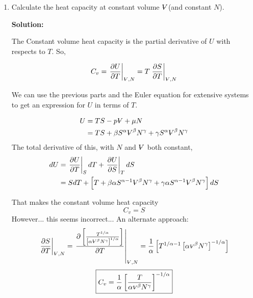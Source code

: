 \documentclass[10pt]{article}
\newenvironment{Solution}
    {\textbf{Solution:}
    
    \vspace{5mm}
    \begin{tcolorbox}
    }
    {
    \end{tcolorbox}
    \vspace{5mm}
    }
\newcommand{\vol}{{\ooalign{\hfil$V$\hfil\cr\kern0.08em--\hfil\cr}}}
\begin{document}
\begin{enumerate}
\begin{enumerate}
\begin{Solution}
    \end{Solution}


    \item Calculate the heat capacity at constant volume $\vol$(and constant $N$).
    
    \begin{Solution}    
    The Constant volume heat capacity is the partial derivative of $U$ with respects to $T$. So,
    
    \begin{equation}
        C_v = \left.\frac{\partial U}{\partial T}\right|_{\scriptsize{\vol},N} = T\left.\frac{\partial S}{\partial T}\right|_{\scriptsize{\vol},N}
    \end{equation}


    We can use the previous parts and the Euler equation for extensive systems to get an expression for $U$ in terms of $T$.
    
    \begin{align}
        U &= TS - p\vol + \mu N\\
        &= T S + \beta S^\alpha \vol^\beta N^\gamma + \gamma S^\alpha \vol^\beta N^\gamma
    \end{align}
    The total derivative of this, with $N$ and $\vol$ both constant,
    \begin{align}
        dU &= \left.\frac{\partial U}{\partial T}\right|_S dT + \left.\frac{\partial U}{\partial S}\right|_T dS\\
        &= S dT + \left[T + \beta\alpha S^{\alpha-1}\vol^\beta N^\gamma + \gamma\alpha S^{\alpha-1}\vol^\beta N^\gamma\right]dS
    \end{align}
    
    That makes the constant volume heat capacity
    \begin{equation}
    \boxed{
    C_v = S
    }        
    \end{equation}
    However... this seems incorrect... 
    An alternate approach: 
        \begin{equation}
        \left.\frac{\partial S}{\partial T}\right|_{\scriptsize{\vol},N} = \left.\frac{\partial \left[ \frac{T^{1/\alpha}}{\left[\alpha \scriptsize{\vol}^{\beta}N^{\gamma} \right]^{1/\alpha}} \right]}{\partial T}\right|_{\scriptsize{\vol},N} = \frac{1}{\alpha}\left[ T^{1/\alpha-1}\left[\alpha \scriptsize{\vol}^{\beta}N^{\gamma} \right]^{-1/\alpha} \right]
    \end{equation}
    \begin{equation}
    \boxed{
        C_v = \frac{1}{\alpha}\left[\frac{T}{\alpha \scriptsize{\vol}^{\beta}N^{\gamma}} \right]^{-1/\alpha}
        }
    \end{equation}
    

\end{Solution}
\end{enumerate}
\end{enumerate}
\end{document}
